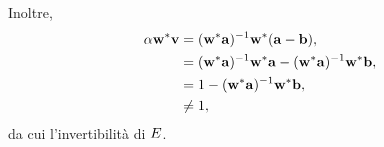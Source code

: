 \par Inoltre,
\begin{align*}
  \alpha{\mathbf{w}}^*\mathbf{v}
  &= ({\mathbf{w}}^*\mathbf{a})^{-1}
    {\mathbf{w}}^*
    (\mathbf{a} - \mathbf{b}),\\
  &= ({\mathbf{w}}^*\mathbf{a})^{-1}
    {\mathbf{w}}^*
    \mathbf{a}
    - ({\mathbf{w}}^*\mathbf{a})^{-1}
    {\mathbf{w}}^*
    \mathbf{b},\\
  &= 1
    - ({\mathbf{w}}^*\mathbf{a})^{-1}
    {\mathbf{w}}^*
    \mathbf{b},\\
  &\neq 1,
\end{align*}
da cui l'invertibilit\`a di $E$. \EndProof
